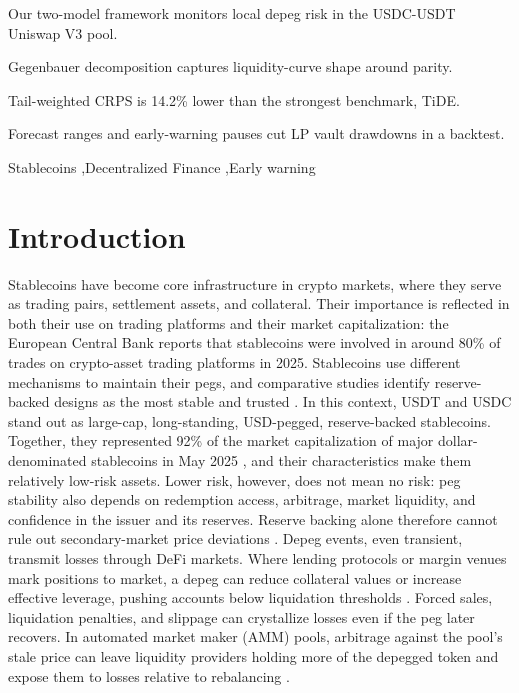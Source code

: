 \documentclass[a4paper,fleqn]{cas-sc}
\begin{document}
\begin{graphicalabstract}
\end{graphicalabstract}

\begin{highlights}
\item Our two-model framework monitors local depeg risk in the USDC-USDT Uniswap V3 pool.
\item Gegenbauer decomposition captures liquidity-curve shape around parity.
\item Tail-weighted CRPS is 14.2\% lower than the strongest benchmark, TiDE.
\item Forecast ranges and early-warning pauses cut LP vault drawdowns in a backtest.
\end{highlights}

\begin{keywords}
Stablecoins \sep Decentralized Finance \sep Early warning
\end{keywords}


\maketitle


\section{Introduction} \label{sec:intro}

Stablecoins have become core infrastructure in crypto markets, where they serve as trading pairs, settlement assets, and collateral. Their importance is reflected in both their use on trading platforms and their market capitalization: the European Central Bank reports that stablecoins were involved in around 80\% of trades on crypto-asset trading platforms in 2025. Stablecoins use different mechanisms to maintain their pegs, and comparative studies identify reserve-backed designs as the most stable and trusted \citep{Yujin2024}. In this context, USDT and USDC stand out as large-cap, long-standing, USD-pegged, reserve-backed stablecoins. Together, they represented 92\% of the market capitalization of major dollar-denominated stablecoins in May 2025 \citep{ECB2025}, and their characteristics make them relatively low-risk assets. Lower risk, however, does not mean no risk: peg stability also depends on redemption access, arbitrage, market liquidity, and confidence in the issuer and its reserves. Reserve backing alone therefore cannot rule out secondary-market price deviations \citep{Lyons2023}. Depeg events, even transient, transmit losses through DeFi markets. Where lending protocols or margin venues mark positions to market, a depeg can reduce collateral values or increase effective leverage, pushing accounts below liquidation thresholds \citep{Perez2021}. Forced sales, liquidation penalties, and slippage can crystallize losses even if the peg later recovers. In automated market maker (AMM) pools, arbitrage against the pool’s stale price can leave liquidity providers holding more of the depegged token and expose them to losses relative to rebalancing \citep{Milionis2022}.
\end{document}
